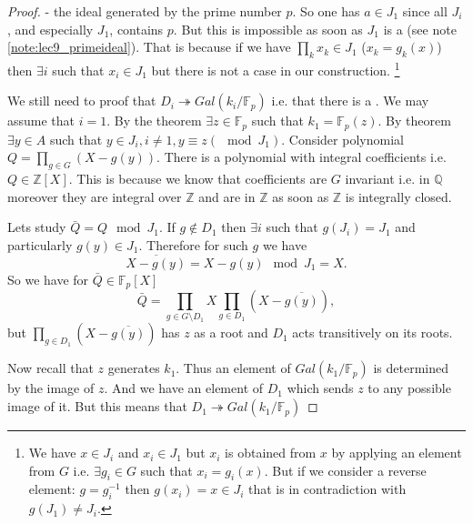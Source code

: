 \begin{theorem}
\begin{proof}
{      \label{note:lec9_primeideal}
    }
    - the ideal generated by the prime
    number $p$. So one has $a \in J_1$ since all $J_i$, and
    especially $J_1$, contains $p$. But this is impossible as soon as
    $J_1$ is a  (see note
    \ref{note:lec9_primeideal}). That is because if we have 
    $\prod_k x_k \in J_1$ ($x_k = g_k(x)$)
    then $\exists i$ such that $x_i \in J_1$ but
    there is not a case in our construction.
    \footnote{
      We have $x
      \in J_i$ and $x_i \in J_1$ but $x_i$ is obtained from $x$ by
      applying an element from $G$ i.e. $\exists g_i \in G$ such that
      $x_i = g_i(x)$. But if we consider a reverse element: $g =
      g^{-1}_i$ then $g(x_i) = x \in 
      J_i$ that is in contradiction with $g(J_1) \ne J_i$.
    }

    We still need to proof that $D_i \twoheadrightarrow
    Gal\left(k_i/\mathbb{F}_p\right)$ i.e. that there is a
    . We may assume that $i=1$. By the
     theorem $\exists z \in
    \mathbb{F}_p$ such that $k_1 = \mathbb{F}_p\left(z\right)$. 
    By  theorem $\exists y \in A$ such that
    $y \in J_i, i \ne 1,  y \equiv z (\mod J_1)$. Consider polynomial
    $Q = \prod_{g \in G} \left(X - g\left(y\right)\right)$. There is a
    polynomial with integral coefficients i.e.
    $Q \in \mathbb{Z}\left[X\right]$. This is because we know that
    coefficients are $G$ invariant i.e. in $\mathbb{Q}$ moreover they
    are integral over $\mathbb{Z}$ and are in $\mathbb{Z}$ as soon as
    $\mathbb{Z}$ is integrally closed.

    Lets study $\bar{Q} = Q \mod J_1$. If $g \notin D_1$ then $\exists
    i$ such that $g\left(J_i\right) = J_1$ and particularly $g(y) \in
    J_1$. Therefore for such $g$ we have
    \[
    \overline{X -g\left(y\right)} = X -g\left(y\right) \mod J_1 = X. 
    \]
    So we have for $\bar{Q} \in \mathbb{F}_p\left[X\right]$
    \[
    \bar{Q} = \prod_{g \in G \setminus D_1} X \prod_{g \in D_1}
    \left(X - \overline{g\left(y\right)}\right),
    \]
    but
    \(
    \prod_{g \in D_1}
    \left(X - \overline{g\left(y\right)}\right)
    \) has $z$ as a root and $D_1$ acts transitively on its roots.

    Now recall that $z$ generates $k_1$. Thus an element of
    $Gal\left(k_1/\mathbb{F}_p\right)$ is determined by the image of
    $z$. And we have an element of $D_1$ which sends $z$ to any
    possible image of it. But this means that
    \(
    D_1 \twoheadrightarrow
    Gal\left(k_1/\mathbb{F}_p\right)
    \)


\end{proof}
\end{theorem}
